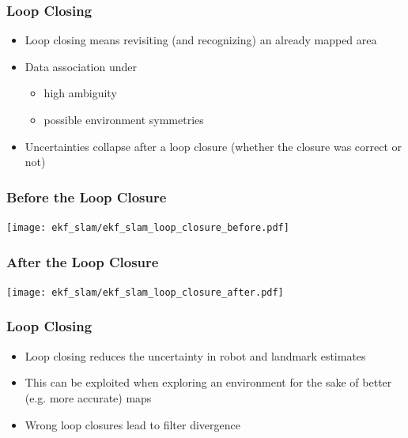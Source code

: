 \begin{frame}
    \frametitle{Loop Closing}

    \begin{itemize}
    \item Loop closing means revisiting (and recognizing) an already mapped area
    \item Data association under
    \begin{itemize}
        \item high ambiguity
        \item possible environment symmetries
    \end{itemize}
    \item Uncertainties collapse after a loop closure (whether the closure was correct or not) 
    \end{itemize}
\end{frame}

\begin{frame}
    \frametitle{Before the Loop Closure}

    \begin{center}
        \texttt{[image: ekf\_slam/ekf\_slam\_loop\_closure\_before.pdf]}
    \end{center}
\end{frame}

\begin{frame}
    \frametitle{After the Loop Closure}

    \begin{center}
        \texttt{[image: ekf\_slam/ekf\_slam\_loop\_closure\_after.pdf]}
    \end{center}
\end{frame}

\begin{frame}
    \frametitle{Loop Closing}

    \begin{itemize}
    \item Loop closing reduces the uncertainty in robot and landmark estimates
    \item This can be exploited when exploring an environment for the sake of better (e.g. more accurate) maps
    \item Wrong loop closures lead to filter divergence
    \end{itemize}
\end{frame}

